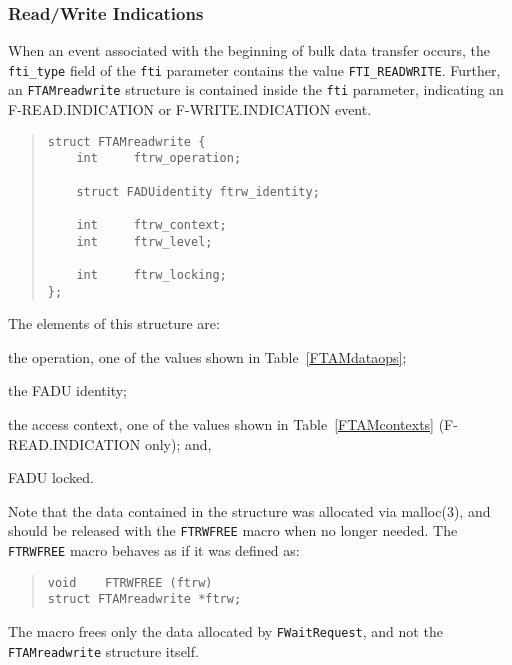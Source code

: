 \subsubsection	{Read/Write Indications}
When an event associated with the beginning of bulk data transfer occurs,
the \verb"fti_type" field of the \verb"fti" parameter contains the value
\verb"FTI_READWRITE".
Further,
an \verb"FTAMreadwrite" structure is contained inside the \verb"fti" parameter,
indicating an {\sf F-READ.INDICATION\/} or {\sf F-WRITE.INDICATION\/} event.
\begin{quote}\small\begin{verbatim}
struct FTAMreadwrite {
    int     ftrw_operation;

    struct FADUidentity ftrw_identity;

    int     ftrw_context;
    int     ftrw_level;

    int     ftrw_locking;
};
\end{verbatim}\end{quote}
The elements of this structure are:
\begin{describe}
\item[\verb"ftrw\_operation":] the operation,
one of the values shown in Table~\ref{FTAMdataops};

\item[\verb"ftrw\_identity":] the FADU identity;

\item[\verb"ftrw\_context"/\verb"ftrw\_level":] the access context,
one of the values shown in Table~\ref{FTAMcontexts}
({\sf F-READ.INDICATION\/} only);
and,

\item[\verb"ftrw\_locking":] FADU locked.
\end{describe}
Note that the data contained in the structure was allocated via \man malloc(3),
and should be released with the \verb"FTRWFREE" macro when no longer needed.
The \verb"FTRWFREE" macro
behaves as if it was defined as:
\begin{quote}\small\begin{verbatim}
void    FTRWFREE (ftrw)
struct FTAMreadwrite *ftrw;
\end{verbatim}\end{quote}
The macro frees only the data allocated by \verb"FWaitRequest",
and not the \verb"FTAMreadwrite" structure itself.

